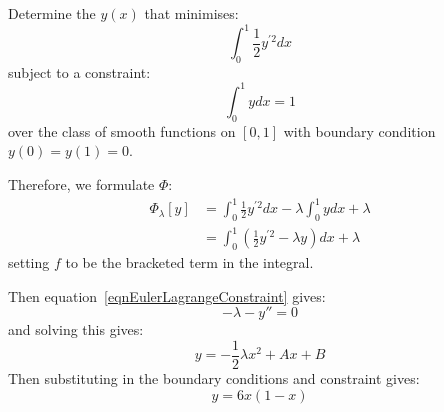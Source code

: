 \documentclass[../Main.tex]{subfiles}
\begin{document}
\begin{example}
    Determine the $y(x)$ that minimises:
    \begin{equation*}
        \int_0^1 \frac{1}{2} y^{\prime 2} dx 
    \end{equation*}
    subject to a constraint:
    \begin{equation*}
        \int_0^1 y dx = 1
    \end{equation*}
    over the class of smooth functions on $[0, 1]$ with boundary condition $y(0) = y(1) = 0$.

    Therefore, we formulate $\Phi$:
    \begin{align*}
        \Phi_\lambda[y] &= \int_0^1 \frac{1}{2} y^{\prime 2} dx - \lambda \int_0^1 y dx + \lambda \\
        &= \int_0^1 \left(\frac{1}{2} y^{\prime 2} - \lambda y\right)dx + \lambda
    \end{align*}
    setting $f$ to be the bracketed term in the integral.

    Then equation~\ref{eqnEulerLagrangeConstraint} gives:
    \begin{equation*}
        -\lambda - y'' = 0
    \end{equation*}
    and solving this gives:
    \begin{equation*}
        y = -\frac{1}{2} \lambda x^2 + Ax + B
    \end{equation*}
    Then substituting in the boundary conditions and constraint gives:
    \begin{equation*}
        y = 6x(1 - x)
    \end{equation*}
\end{example}
\end{document}
